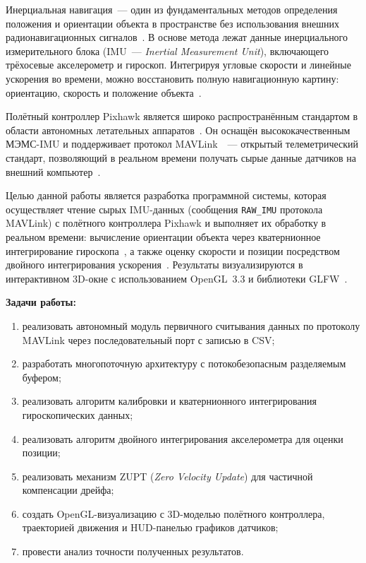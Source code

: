Инерциальная навигация~--- один из фундаментальных методов определения
положения и ориентации объекта в пространстве без использования внешних
радионавигационных сигналов~\cite{woodman2007}. В основе метода лежат данные
инерциального измерительного блока (IMU~--- \textit{Inertial Measurement Unit}),
включающего трёхосевые акселерометр и гироскоп. Интегрируя угловые скорости и
линейные ускорения во времени, можно восстановить полную навигационную картину:
ориентацию, скорость и положение объекта~\cite{titterton2004}.
 
Полётный контроллер Pixhawk является широко распространённым стандартом в области
автономных летательных аппаратов~\cite{px4_docs}. Он оснащён высококачественным
МЭМС-IMU и поддерживает протокол MAVLink~\cite{mavlink_proto}~--- открытый
телеметрический стандарт, позволяющий в реальном времени получать сырые данные
датчиков на внешний компьютер~\cite{mavlink_docs}.
 
Целью данной работы является разработка программной системы, которая осуществляет
чтение сырых IMU-данных (сообщения \texttt{RAW\_IMU} протокола MAVLink) с
полётного контроллера Pixhawk и выполняет их обработку в реальном времени:
вычисление ориентации объекта через кватернионное интегрирование
гироскопа~\cite{kuipers1999}, а также оценку скорости и позиции посредством
двойного интегрирования ускорения~\cite{groves2013}. Результаты визуализируются
в интерактивном 3D-окне с использованием OpenGL~3.3 и библиотеки
GLFW~\cite{glfw_docs}.
 
\textbf{Задачи работы:}
\begin{enumerate}[leftmargin=2cm]
    \item реализовать автономный модуль первичного считывания данных по протоколу
          MAVLink через последовательный порт с записью в CSV;
    \item разработать многопоточную архитектуру с потокобезопасным разделяемым
          буфером;
    \item реализовать алгоритм калибровки и кватернионного интегрирования
          гироскопических данных;
    \item реализовать алгоритм двойного интегрирования акселерометра для
          оценки позиции;
    \item реализовать механизм ZUPT (\textit{Zero Velocity Update}) для
          частичной компенсации дрейфа;
    \item создать OpenGL-визуализацию с 3D-моделью полётного контроллера,
          траекторией движения и HUD-панелью графиков датчиков;
    \item провести анализ точности полученных результатов.
\end{enumerate}
 
